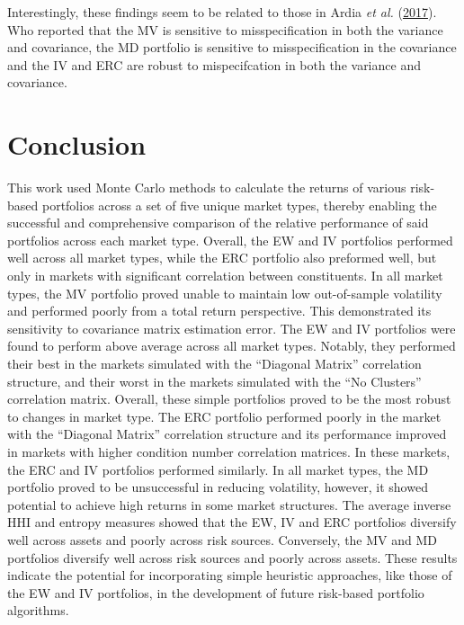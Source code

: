 \documentclass[11pt,preprint, authoryear]{elsarticle}
\numberwithin{equation}{section}
\numberwithin{figure}{section}
\numberwithin{table}{section}
\begin{document}
Interestingly, these findings seem to be related to those in Ardia
\emph{et al.} (\protect\hyperlink{ref-ardia2017}{2017}). Who reported
that the MV is sensitive to misspecification in both the variance and
covariance, the MD portfolio is sensitive to misspecification in the
covariance and the IV and ERC are robust to mispecifcation in both the
variance and covariance.

\newpage

\hypertarget{conclusion}{%
\section{\texorpdfstring{Conclusion
\label{conclusion}}{Conclusion }}\label{conclusion}}

This work used Monte Carlo methods to calculate the returns of various
risk-based portfolios across a set of five unique market types, thereby
enabling the successful and comprehensive comparison of the relative
performance of said portfolios across each market type. Overall, the EW
and IV portfolios performed well across all market types, while the ERC
portfolio also preformed well, but only in markets with significant
correlation between constituents. In all market types, the MV portfolio
proved unable to maintain low out-of-sample volatility and performed
poorly from a total return perspective. This demonstrated its
sensitivity to covariance matrix estimation error. The EW and IV
portfolios were found to perform above average across all market types.
Notably, they performed their best in the markets simulated with the
``Diagonal Matrix'' correlation structure, and their worst in the
markets simulated with the ``No Clusters'' correlation matrix. Overall,
these simple portfolios proved to be the most robust to changes in
market type. The ERC portfolio performed poorly in the market with the
``Diagonal Matrix'' correlation structure and its performance improved
in markets with higher condition number correlation matrices. In these
markets, the ERC and IV portfolios performed similarly. In all market
types, the MD portfolio proved to be unsuccessful in reducing
volatility, however, it showed potential to achieve high returns in some
market structures. The average inverse HHI and entropy measures showed
that the EW, IV and ERC portfolios diversify well across assets and
poorly across risk sources. Conversely, the MV and MD portfolios
diversify well across risk sources and poorly across assets. These
results indicate the potential for incorporating simple heuristic
approaches, like those of the EW and IV portfolios, in the development
of future risk-based portfolio algorithms.
\end{document}

